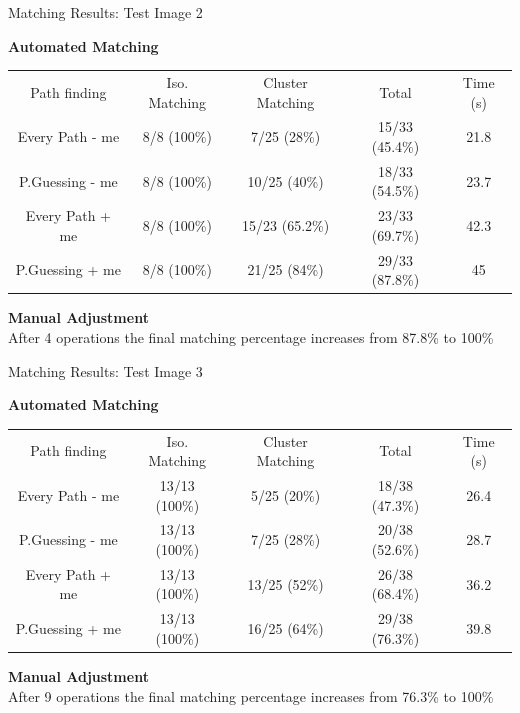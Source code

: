 \documentclass[xcolor=table]{beamer}
\begin{document}
\begin{frame}{Matching Results: Test Image 2}

\large \textbf{Automated Matching}
\begin{scriptsize}
\begin{table}[h]
\begin{center}
\begin{tabular}[h]{|c|c|c|c|c|}
    \hline
    \rowcolor{gray!35}
    Path finding & Iso. Matching & Cluster Matching 
    & Total
    & Time (s) \\ 
    Every Path - me & 8/8 (100\%) & 7/25 (28\%) & 15/33 (\alert{45.4\%}) & 21.8  \\ 
    \hline
    P.Guessing - me & 8/8 (100\%) & 10/25 (40\%) & 18/33 (\alert{54.5\%}) & 23.7 \pause \\
    \hline
    Every Path + me & 8/8 (100\%)& 15/23 (65.2\%) & 23/33 (\alert{69.7\%})& 42.3 \\
    \hline
    P.Guessing + me & 8/8 (100\%)& 21/25 (84\%) & 29/33 (\alert{87.8\%}) & 45 \\
    \hline
  \end{tabular}
\end{center}
\end{table}
\end{scriptsize}\pause

\large \textbf{Manual Adjustment}\\ \vskip10pt
  After 4 operations the final matching percentage increases from 87.8\%
  to 100\%
\end{frame}

\begin{frame}{Matching Results: Test Image 3}

\large \textbf{Automated Matching}
\begin{scriptsize}
\begin{table}[h]
\begin{center}
\begin{tabular}[h]{|c|c|c|c|c|}
    \hline
    \rowcolor{gray!35}
    Path finding & Iso. Matching & Cluster Matching 
    & Total
    & Time (s) \\ 
   Every Path - me & 13/13 (100\%) & 5/25 (20\%) & 18/38 (\alert{47.3\%}) & 26.4 \\ 
    \hline
    P.Guessing - me & 13/13 (100\%) & 7/25 (28\%) & 20/38 (\alert{52.6\%}) & 28.7 \pause\\
    \hline
    Every Path + me & 13/13 (100\%)& 13/25 (52\%) & 26/38 (\alert{68.4\%})& 36.2 \\
    \hline
    P.Guessing + me & 13/13 (100\%)& 16/25 (64\%) & 29/38 (\alert{76.3\%}) & 39.8 \\  
    \hline  
    \end{tabular}
\end{center}
\end{table}
\end{scriptsize} \pause

\large \textbf{Manual Adjustment}\\ \vskip10pt
  After 9 operations the final matching percentage increases from 76.3\% 
  to 100\%

\end{frame}
\end{document}
